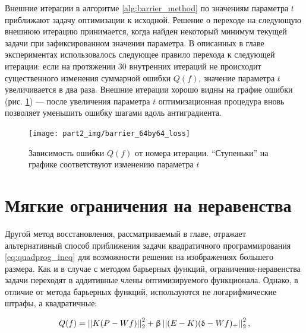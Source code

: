 Внешние итерации в алгоритме \ref{alg:barrier_method} по значениям параметра $t$ приближают задачу оптимизации к исходной.
Решение о переходе на следующую внешнюю итерацию принимается, когда найден некоторый минимум текущей задачи при зафиксированном значении параметра. 
В описанных в главе экспериментах использовалось следующее правило перехода к следующей итерации: если на протяжении 30 внутренних итераций не происходит существенного изменения суммарной ошибки $Q(f)$, значение параметра $t$ увеличивается в два раза.
Внешние итерации хорошо видны на графие ошибки (рис. \ref{fig:barrier_64by64_loss}) --- после увеличения параметра $t$ оптимизационная процедура вновь позволяет уменьшить ошибку шагами вдоль антиградиента. 


\begin{figure}
    \centering
    \texttt{[image: part2\_img/barrier\_64by64\_loss]} \\
    \caption{ Зависимость ошибки $Q(f)$ от номера итерации. ``Ступеньки'' на графике соответствуют изменению параметра $t$}
    \label{fig:barrier_64by64_loss}
\end{figure}


\section{Мягкие ограничения на неравенства} \label{sect_2_2}

Другой метод восстановления, рассматриваемый в главе, отражает альтернативный способ приближения задачи квадратичного программирования \eqref{eq:quadprog_ineq} для возможности решения на изображениях большего размера.
Как и в случае с методом барьерных функций, ограничения-неравенства задачи переходят в аддитивные члены оптимизируемого функционала.
Однако, в отличие от метода барьерных функций, используются не логарифмические штрафы, а квадратичные:

\begin{equation}
  \label{eq:soft_ineq_goal}
  Q(f) =  \left|\left| K(P - Wf) \right|\right|_2^2 + \upbeta \left|\left| (E-K)(\updelta - Wf)_+ \right|\right|_2^2,
\end{equation}

